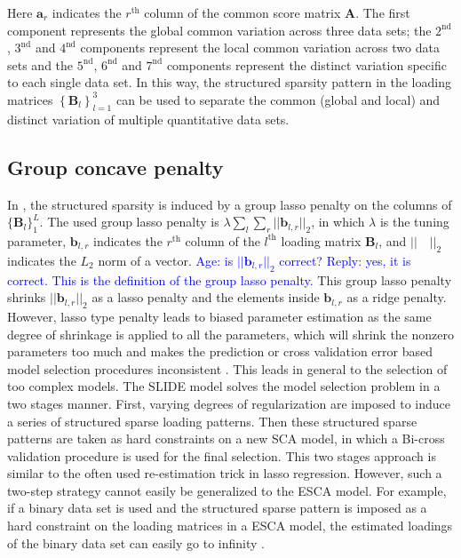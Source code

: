 Here $\mathbf{a}_r$ indicates the $r^{\text{th}}$ column of the common score matrix $\mathbf{A}$. The first component represents the global common variation across three data sets; the $2^{\text{nd}}$, $3^{\text{nd}}$ and $4^{\text{nd}}$ components represent the local common variation across two data sets and the $5^{\text{nd}}$, $6^{\text{nd}}$ and $7^{\text{nd}}$ components represent the distinct variation specific to each single data set. In this way, the structured sparsity pattern in the loading matrices $\left\{\mathbf{B}_l \right\}_{l=1}^{3}$ can be used to separate the common (global and local) and distinct variation of multiple quantitative data sets.

\subsection{Group concave penalty}
In \cite{van2011flexible,acar2015data,gaynanova2017structural}, the structured sparsity is induced by a group lasso penalty on the columns of $\{ \mathbf{B}_l \}_{1}^{L}$. The used group lasso penalty is $\lambda \sum_{l}\sum_{r} ||\mathbf{b}_{l,r}||_{2}$, in which $\lambda$ is the tuning parameter, $\mathbf{b}_{l,r}$ indicates the $r^{\text{th}}$ column of the $l^{\text{th}}$ loading matrix $\mathbf{B}_l$, and $||\quad||_{2}$ indicates the $L_2$ norm of a vector. \textcolor{blue}{Age: is $||\mathbf{b}_{l,r}||_{2}$ correct? Reply: yes, it is correct. This is the definition of the group lasso penalty.} This group lasso penalty shrinks $||\mathbf{b}_{l,r}||_{2}$ as a lasso penalty and the elements inside $\mathbf{b}_{l,r}$ as a ridge penalty. However, lasso type penalty leads to biased parameter estimation as the same degree of shrinkage is applied to all the parameters, which will shrink the nonzero parameters too much and makes the prediction or cross validation error based model selection procedures inconsistent \cite{meinshausen2006high,leng2006note}. This leads in general to the selection of too complex models. The SLIDE model \cite{gaynanova2017structural} solves the model selection problem in a two stages manner. First, varying degrees of regularization are imposed to induce a series of structured sparse loading patterns. Then these structured sparse patterns are taken as hard constraints on a new SCA model, in which a Bi-cross validation procedure \cite{perry2009cross} is used for the final selection. This two stages approach is similar to the often used re-estimation trick in lasso regression. However, such a two-step strategy cannot easily be generalized to the ESCA model. For example, if a binary data set is used and the structured sparse pattern is imposed as a hard constraint on the loading matrices in a ESCA model, the estimated loadings of the binary data set can easily go to infinity \cite{groenen2016multinomial,song2018generalized}.

